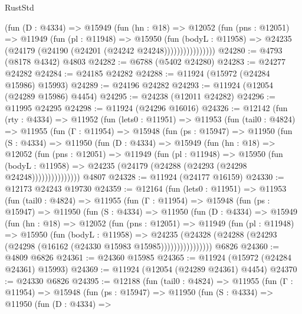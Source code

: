 \begin{lexlean}{RustStd}
\begin{coremodule}
                  (fun (D : @4334) =>
                  @15949
                    (fun (hn : @18) =>
                    @12052
                      (fun (pns : @12051) =>
                      @11949
                        (fun (pl : @11948) =>
                        @15950
                          (fun (bodyL : @11958) =>
                          @24235 (@24179 (@24190 (@24201 (@24242 @24248))))))))))))))))
@24280 := @4793 (@8178 @4342) @4803
@24282 := @6788 (@5402 @24280)
@24283 := @24277 @24282
@24284 := @24185 @24282
@24288 := @11924 (@15972 (@24284 @15986) @15993)
@24289 := @24196 @24282
@24293 := @11924 (@12054 (@24289 @15986) @4454)
@24295 := @24238 (@12011 @24282)
@24296 := @11995 @24295
@24298 := @11924 (@24296 @16016)
@24326 := @12142
    (fun (rty : @4334) =>
    @11952
      (fun (lets0 : @11951) =>
      @11953
        (fun (tail0 : @4824) =>
        @11955
          (fun (Γ : @11954) =>
          @15948
            (fun (ps : @15947) =>
            @11950
              (fun (S : @4334) =>
              @11950
                (fun (D : @4334) =>
                @15949
                  (fun (hn : @18) =>
                  @12052
                    (fun (pns : @12051) =>
                    @11949
                      (fun (pl : @11948) =>
                      @15950
                        (fun (bodyL : @11958) =>
                        @24235 (@24179 (@24288 (@24293 (@24298 @24248)))))))))))))))
    @4807
@24328 := @11924 (@24177 @16159)
@24330 := @12173 @24243 @19730
@24359 := @12164
    (fun (lets0 : @11951) =>
    @11953
      (fun (tail0 : @4824) =>
      @11955
        (fun (Γ : @11954) =>
        @15948
          (fun (ps : @15947) =>
          @11950
            (fun (S : @4334) =>
            @11950
              (fun (D : @4334) =>
              @15949
                (fun (hn : @18) =>
                @12052
                  (fun (pns : @12051) =>
                  @11949
                    (fun (pl : @11948) =>
                    @15950
                      (fun (bodyL : @11958) =>
                      @24235
                        (@24328
                          (@24288 (@24293 (@24298 (@16162 (@24330 @15983 @15985))))))))))))))))
    @6826
@24360 := @4809 @6826
@24361 := @24360 @15985
@24365 := @11924 (@15972 (@24284 @24361) @15993)
@24369 := @11924 (@12054 (@24289 @24361) @4454)
@24370 := @24330 @6826
@24395 := @12188
    (fun (tail0 : @4824) =>
    @11955
      (fun (Γ : @11954) =>
      @15948
        (fun (ps : @15947) =>
        @11950
          (fun (S : @4334) =>
          @11950
            (fun (D : @4334) =>

\end{coremodule}
\end{lexlean}
